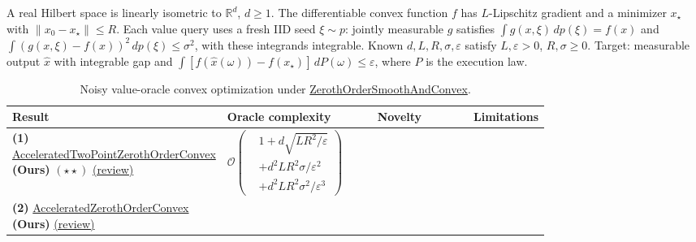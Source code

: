 \begin{table}[tp]
\centering
\caption{Noisy value-oracle convex optimization under \href{https://github.com/k3nfalt/longtails/blob/main/LongTails/Setups/ZerothOrderSmoothAndConvex.lean}{ZerothOrderSmoothAndConvex}.}\label{tab:ZerothOrderSmoothAndConvex}
\parbox{\linewidth}{\footnotesize A real Hilbert space is linearly isometric to $\mathbb R^d$, $d\ge1$. The differentiable convex function $f$ has $L$-Lipschitz gradient and a minimizer $x_\star$ with $\|x_0-x_\star\|\le R$. Each value query uses a fresh IID seed $\xi\sim p$: jointly measurable $g$ satisfies $\int g(x,\xi)\,dp(\xi)=f(x)$ and $\int(g(x,\xi)-f(x))^2\,dp(\xi)\le\sigma^2$, with these integrands integrable. Known $d,L,R,\sigma,\varepsilon$ satisfy $L,\varepsilon>0$, $R,\sigma\ge0$. Target: measurable output $\widehat x$ with integrable gap and $\int[f(\widehat x(\omega))-f(x_\star)]\,dP(\omega)\le\varepsilon$, where $P$ is the execution law.}\par\smallskip
\begin{threeparttable}
\footnotesize
\setlength{\tabcolsep}{4pt}\renewcommand{\arraystretch}{1.25}
\begin{tabularx}{\linewidth}{@{}>{\raggedright\arraybackslash}p{0.20\linewidth}>{\raggedright\arraybackslash}p{0.32\linewidth}>{\raggedright\arraybackslash}p{0.25\linewidth}>{\raggedright\arraybackslash}X@{}}
\toprule
\textbf{Result} & \textbf{Oracle complexity} & \textbf{Novelty} & \textbf{Limitations} \\
\midrule
\textbf{(1)} \href{https://github.com/k3nfalt/longtails/blob/main/LongTails/Theorems/AcceleratedTwoPointZerothOrderConvex.lean}{Accelerated\allowbreak Two\allowbreak Point\allowbreak Zeroth\allowbreak Order\allowbreak Convex} \textbf{(Ours)} $(\star\star)$ \href{https://github.com/k3nfalt/longtails/blob/main/scripts/reviews/AcceleratedTwoPointZerothOrderConvex.md}{(review)}
& $\mathcal{O}\!\left(\begin{aligned}&1+d\sqrt{LR^2/\varepsilon}\\&+d^2LR^2\sigma/\varepsilon^2\\&+d^2LR^2\sigma^2/\varepsilon^3\end{aligned}\right)$ & & \\
\midrule
\textbf{(2)} \href{https://github.com/k3nfalt/longtails/blob/main/LongTails/Theorems/AcceleratedZerothOrderConvex.lean}{Accelerated\allowbreak Zeroth\allowbreak Order\allowbreak Convex} \textbf{(Ours)} \href{https://github.com/k3nfalt/longtails/blob/main/scripts/reviews/AcceleratedZerothOrderConvex.md}{(review)}

\end{tabularx}
\end{threeparttable}
\end{table}
